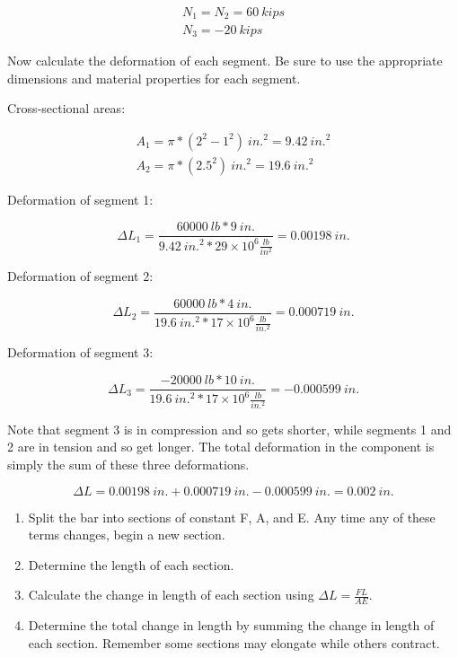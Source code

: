 \documentclass[
  letterpaper,
  DIV=11,
  numbers=noendperiod]{scrreprt}
\begin{document}
\begin{tcolorbox}
\begin{tcolorbox}
\[
\begin{gathered}
N_1=N_2=60{~kips} \\
N_3=-20{~kips}
\end{gathered}
\]

Now calculate the deformation of each segment. Be sure to use the
appropriate dimensions and material properties for each segment.

Cross-sectional areas:

\[
\begin{gathered}
A_1=\pi*(2^2-1^2){~in.}^2=9.42{~in.}^2 \\
A_2=\pi*(2.5^2){~in.}^2=19.6{~in.}^2
\end{gathered}
\]

Deformation of segment 1:

\[
\Delta L_1=\frac{60000{~lb} * 9{~in.}}{9.42{~in.}^2 * 29 \times 10^6\frac{lb}{in^2}}=0.00198{~in.}
\]

Deformation of segment 2:

\[
\Delta L_2=\frac{60000{~lb} * 4{~in.}}{19.6{~in.}^2 * 17 \times 10^6\frac{lb}{in.^2}}=0.000719{~in} .
\]

Deformation of segment 3:

\[
\Delta L_3=\frac{-20000{~lb} * 10{~in.}}{19.6{~in.}^2 * 17 \times 10^6\frac{lb}{in.^2}}=-0.000599{~in.}
\]

Note that segment 3 is in compression and so gets shorter, while
segments 1 and 2 are in tension and so get longer. The total deformation
in the component is simply the sum of these three deformations.

\[
\Delta L=0.00198{~in.}+0.000719{~in.}-0.000599{~in.}=0.002{~in.}
\]

\end{tcolorbox}

\end{tcolorbox}

\begin{tcolorbox}[enhanced jigsaw, breakable, opacityback=0, toptitle=1mm, left=2mm, colback=white, opacitybacktitle=0.6, colframe=quarto-callout-warning-color-frame, titlerule=0mm, arc=.35mm, leftrule=.75mm, bottomtitle=1mm, colbacktitle=quarto-callout-warning-color!10!white, rightrule=.15mm, title={Step-by-step: Axial deformation}, bottomrule=.15mm, toprule=.15mm, coltitle=black]

\begin{enumerate}
\def\labelenumi{\arabic{enumi}.}
\item
  Split the bar into sections of constant F, A, and E. Any time any of
  these terms changes, begin a new section.
\item
  Determine the length of each section.
\item
  Calculate the change in length of each section using
  \(\Delta L=\frac{F L}{A E}\).
\item
  Determine the total change in length by summing the change in length
  of each section. Remember some sections may elongate while others
  contract.
\end{enumerate}

\end{tcolorbox}
\end{document}
